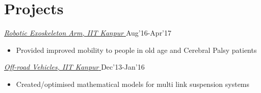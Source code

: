 \documentclass[letterpaper]{twentysecondcv} %
\begin{document}
\section{Projects}

\href{https://www.youtube.com/watch?v=ExcLjyNvF9I&feature=emb_title}{{\sl{Robotic Exoskeleton Arm, IIT Kanpur}  }}
\hfill Aug'16-Apr'17
\begin{itemize}%
\item Provided improved mobility to people in old age and Cerebral Palsy patients

\end{itemize}
\href{https://www.youtube.com/watch?v=8xSa60V9X4c&feature=emb_title}{{\sl{Off-road Vehicles, IIT Kanpur}  }}
\hfill Dec'13-Jan'16
\begin{itemize}%
\item Created/optimised mathematical models for multi link suspension systems
\end{itemize}
\end{document}
